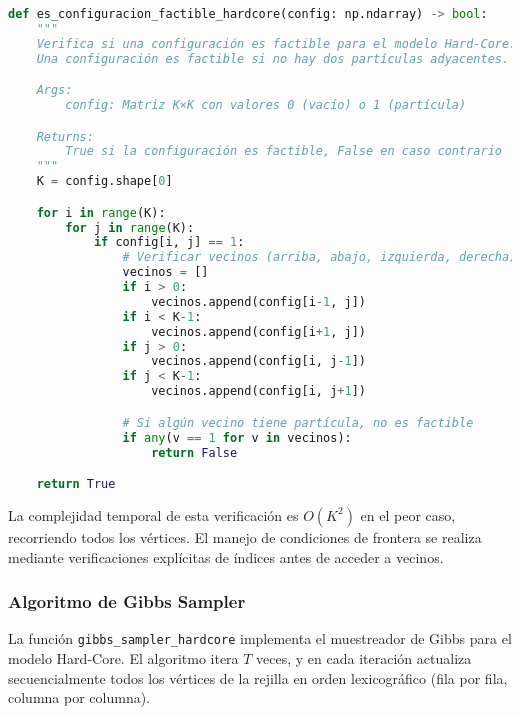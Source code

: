 \begin{lstlisting}[language=Python]
def es_configuracion_factible_hardcore(config: np.ndarray) -> bool:
    """
    Verifica si una configuración es factible para el modelo Hard-Core.
    Una configuración es factible si no hay dos partículas adyacentes.

    Args:
        config: Matriz K×K con valores 0 (vacío) o 1 (partícula)

    Returns:
        True si la configuración es factible, False en caso contrario
    """
    K = config.shape[0]

    for i in range(K):
        for j in range(K):
            if config[i, j] == 1:
                # Verificar vecinos (arriba, abajo, izquierda, derecha)
                vecinos = []
                if i > 0:
                    vecinos.append(config[i-1, j])
                if i < K-1:
                    vecinos.append(config[i+1, j])
                if j > 0:
                    vecinos.append(config[i, j-1])
                if j < K-1:
                    vecinos.append(config[i, j+1])

                # Si algún vecino tiene partícula, no es factible
                if any(v == 1 for v in vecinos):
                    return False

    return True
\end{lstlisting}

La complejidad temporal de esta verificación es $O(K^2)$ en el peor caso, recorriendo todos los vértices. El manejo de condiciones de frontera se realiza mediante verificaciones explícitas de índices antes de acceder a vecinos.

\subsubsection{Algoritmo de Gibbs Sampler}

La función \texttt{gibbs\_sampler\_hardcore} implementa el muestreador de Gibbs para el modelo Hard-Core. El algoritmo itera $T$ veces, y en cada iteración actualiza secuencialmente todos los vértices de la rejilla en orden lexicográfico (fila por fila, columna por columna).

